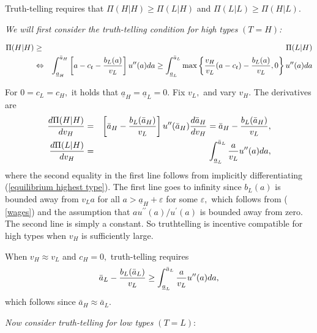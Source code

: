 \documentclass[12pt]{article}
\begin{document}
Truth-telling requires that $\Pi (H|H)\geq \Pi (L|H)$ and $\Pi (L|L)\geq \Pi
(H|L).$

\textit{We will first consider the truth-telling condition for high types }$%
(T=H)$\textit{:}

\begin{eqnarray}
\Pi (H|H) &\geq &\Pi (L|H)  \label{truth1} \\
&\Leftrightarrow &\int_{\underline{a}_{H}}^{\bar{a}_{H}}\left[ a-c_{t}-\frac{%
b_{L}(a)}{v_{L}}\right] u^{\prime \prime }(a)da\geq \int_{\underline{a}%
_{L}}^{\bar{a}_{L}}\max \left\{ \frac{v_{H}}{v_{L}}(a-c_{t})-\frac{b_{L}(a)}{%
v_{L}},0\right\} u^{\prime \prime }(a)da  \label{truth2}
\end{eqnarray}

For $0=c_{L}=c_{H},$ it holds that $\underline{a}_{H}=\underline{a}_{L}=0.$
Fix $v_{L},$ and vary $v_{H}.$ The derivatives are%
\begin{eqnarray}
\frac{d\Pi (H|H)}{dv_{H}} &=&\left[ \bar{a}_{H}-\frac{b_{L}(\bar{a}_{H})}{%
v_{L}}\right] u^{\prime \prime }(\bar{a}_{H})\frac{d\bar{a}_{H}}{dv_{H}}=%
\bar{a}_{H}-\frac{b_{L}(\bar{a}_{H})}{v_{L}},  \label{truth3} \\
\frac{d\Pi (L|H)}{dv_{H}} &=&\int_{\underline{a}_{L}}^{\bar{a}_{L}}\frac{a}{%
v_{L}}u^{\prime \prime }(a)da,  \label{truth4}
\end{eqnarray}%
where the second equality in the first line follows from implicitly
differentiating (\ref{equilibrium highest type}). The first line goes to
infinity since $b_{L}(a)$ is bounded away from $v_{L}a$ for all $a>%
\underline{a}_{H}+\varepsilon $ for some $\varepsilon ,$ which follows from (%
\ref{wages}) and the assumption that $au^{\prime \prime }(a)/u^{\prime }(a)$
is bounded away from zero. The second line is simply a constant. So
truthtelling is incentive compatible for high types when $v_{H}$ is
sufficiently large.

When $v_{H}\approx v_{L}$ and $c_{H}=0,$ truth-telling requires 
\begin{equation}
\bar{a}_{L}-\frac{b_{L}(\bar{a}_{L})}{v_{L}}\geq \int_{\underline{a}_{L}}^{%
\bar{a}_{L}}\frac{a}{v_{L}}u^{\prime \prime }(a)da,  \label{truth-local}
\end{equation}%
which follows since $\bar{a}_{H}\approx \bar{a}_{L}.$

\textit{Now consider truth-telling for low types }$(T=L):$
\end{document}
